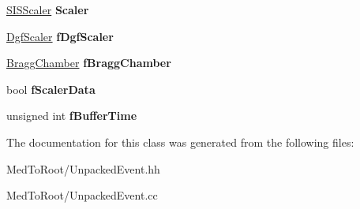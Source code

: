 \begin{DoxyCompactItemize}
\hyperlink{class_s_i_s_scaler}{S\+I\+S\+Scaler} {\bfseries Scaler}
\item 
\mbox{\label{class_unpacked_event_ad0a12f7dec89cf5cad8f7df4c2fe5013}} 
\hyperlink{class_dgf_scaler}{Dgf\+Scaler} {\bfseries f\+Dgf\+Scaler}
\item 
\mbox{\label{class_unpacked_event_ac705f3a8de8500aeb6f7cb3951b76d0e}} 
\hyperlink{class_bragg_chamber}{Bragg\+Chamber} {\bfseries f\+Bragg\+Chamber}
\item 
\mbox{\label{class_unpacked_event_a13011a375b40157797fbd84e4a4fd092}} 
bool {\bfseries f\+Scaler\+Data}
\item 
\mbox{\label{class_unpacked_event_a46e5d49e6b7fb87cf00e4feb03c2b875}} 
unsigned int {\bfseries f\+Buffer\+Time}
\end{DoxyCompactItemize}


The documentation for this class was generated from the following files\+:\begin{DoxyCompactItemize}
\item 
Med\+To\+Root/Unpacked\+Event.\+hh\item 
Med\+To\+Root/Unpacked\+Event.\+cc\end{DoxyCompactItemize}
